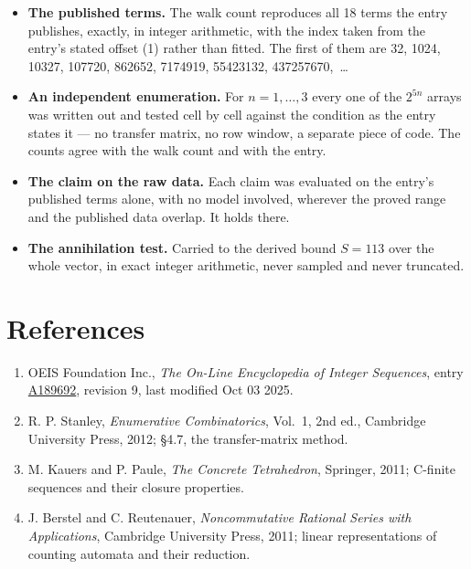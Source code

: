 \documentclass[11pt]{article}
\theoremstyle{definition}
\begin{document}
\begin{itemize}

\item {\bfseries The published terms.} The walk count reproduces all 18 terms the entry publishes, exactly, in integer arithmetic, with the index taken from the entry's stated offset (1) rather than fitted. The first of them are 32, 1024, 10327, 107720, 862652, 7174919, 55423132, 437257670,~\dots

\item {\bfseries An independent enumeration.} For $n = 1,\dots,3$ every one of the $2^{5n}$ arrays was written out and tested cell by cell against the condition as the entry states it --- no transfer matrix, no row window, a separate piece of code. The counts agree with the walk count and with the entry.

\item {\bfseries The claim on the raw data.} Each claim was evaluated on the entry's published terms alone, with no model involved, wherever the proved range and the published data overlap. It holds there.

\item {\bfseries The annihilation test.} Carried to the derived bound $S = 113$ over the whole vector, in exact integer arithmetic, never sampled and never truncated.

\end{itemize}

\section{References}

\begin{enumerate}

\item OEIS Foundation Inc., \emph{The On-Line Encyclopedia of Integer Sequences}, entry \href{https://oeis.org/A189692}{A189692}, revision 9, last modified Oct 03 2025.

\item R. P. Stanley, \emph{Enumerative Combinatorics}, Vol.~1, 2nd ed., Cambridge University Press, 2012; \S4.7, the transfer-matrix method.

\item M. Kauers and P. Paule, \emph{The Concrete Tetrahedron}, Springer, 2011; C-finite sequences and their closure properties.

\item J. Berstel and C. Reutenauer, \emph{Noncommutative Rational Series with Applications}, Cambridge University Press, 2011; linear representations of counting automata and their reduction.

\end{enumerate}
\end{document}
